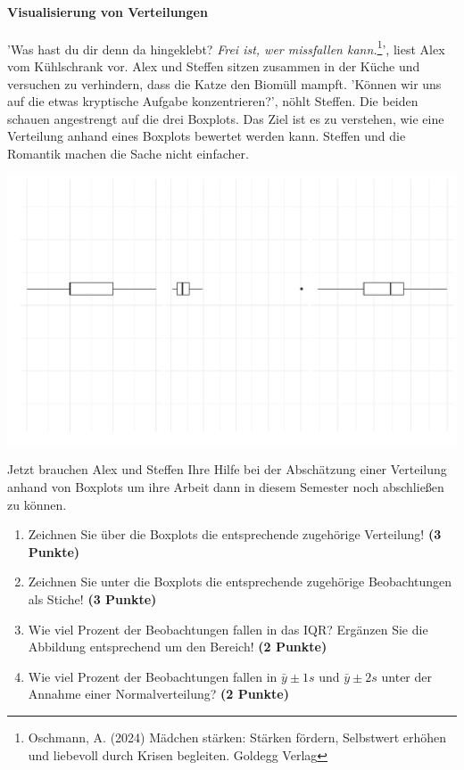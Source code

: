 \documentclass[a4paper, 9pt]{scrartcl}\usepackage[]{graphicx}\usepackage[]{xcolor}
\makeatletter
\def\maxwidth{ %
  \ifdim\Gin@nat@width>\linewidth
    \linewidth
  \else
    \Gin@nat@width
  \fi
}
\makeatother
\begin{document}
\ifcollection
\paragraph{Visualisierung von Verteilungen}
\fi

'Was hast du dir denn da hingeklebt? \textit{Frei ist, wer missfallen kann.}\footnote{Oschmann, A. (2024) Mädchen stärken: Stärken fördern, Selbstwert erhöhen und liebevoll durch Krisen begleiten. Goldegg Verlag}', liest Alex vom Kühlschrank vor. Alex und Steffen sitzen zusammen in der Küche und versuchen zu verhindern, dass die Katze den Biomüll mampft. 'Können wir uns auf die etwas kryptische Aufgabe konzentrieren?', nöhlt Steffen. Die beiden schauen angestrengt auf die drei Boxplots. Das Ziel ist es zu verstehen, wie eine Verteilung anhand eines Boxplots bewertet werden kann. Steffen und die Romantik machen die Sache nicht einfacher.



{\centering \includegraphics[width=\maxwidth]{img/desc-stat-11-1} 

}




Jetzt brauchen Alex und Steffen Ihre Hilfe bei der Abschätzung einer Verteilung anhand von Boxplots um ihre Arbeit dann in diesem Semester noch abschließen zu können.

\begin{enumerate}
\item Zeichnen Sie über die Boxplots die entsprechende zugehörige Verteilung! \textbf{(3 Punkte)} 
\item Zeichnen Sie unter die Boxplots die entsprechende zugehörige Beobachtungen als Stiche! \textbf{(3 Punkte)}
\item Wie viel Prozent der Beobachtungen fallen in das IQR? Ergänzen Sie die Abbildung entsprechend um den Bereich! \textbf{(2 Punkte)}
\item Wie viel Prozent der Beobachtungen fallen in $\bar{y} \pm 1s$ und $\bar{y} \pm 2s$  unter der Annahme einer Normalverteilung? \textbf{(2 Punkte)}
\end{enumerate} 
\clearpage
\end{document}
